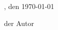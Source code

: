 \cleardoublepage \preface

\lipsum[1]

\lipsum[3]

\medskip
\medskip
\doclocation, den \today

\medskip
der Autor \\
\docauthor


